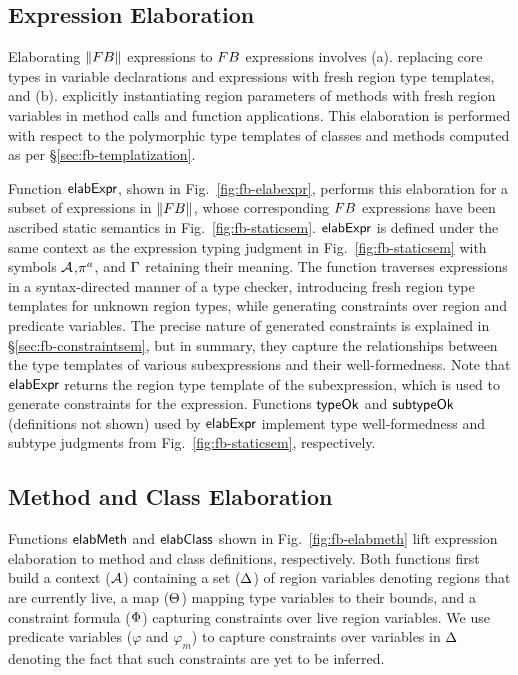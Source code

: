 


\subsection{Expression Elaboration}

Elaborating $\left\| {\sc FB} \right\|$ expressions to ${\sc FB}$ expressions involves
(a). replacing core types in variable declarations and 
expressions with fresh region type templates, and (b). explicitly
instantiating region parameters of methods with fresh region variables
in method calls and function applications. This elaboration is
performed with respect to the polymorphic type templates of classes
and methods computed as per \S\ref{sec:fb-templatization}. 

Function ${\sf elabExpr}$, shown in Fig.~\ref{fig:fb-elabexpr}, performs
this elaboration for a subset of expressions in $\left\| {\sc FB} \right\|$, whose
corresponding ${\sc FB}$ expressions have been ascribed static semantics in
Fig.~\ref{fig:fb-staticsem}. ${\sf elabExpr}$ is defined under the same
context as the expression typing judgment in
Fig.~\ref{fig:fb-staticsem} with symbols ${\mathcal{A}}$,$\pi^a$, and $\Gamma$
retaining their meaning. The function traverses expressions in a
syntax-directed manner of a type checker, introducing fresh region
type templates for unknown region types, while generating constraints
over region and predicate variables. The precise nature of generated
constraints is explained in \S\ref{sec:fb-constraintsem}, but in
summary, they capture the relationships between the type templates of
various subexpressions and their well-formedness. Note that
${\sf elabExpr}$ returns the region type template of the subexpression,
which is used to generate constraints for the expression. Functions
${\sf typeOk}$ and ${\sf subtypeOk}$ (definitions not shown) used by ${\sf elabExpr}$
implement type well-formedness and subtype judgments from
Fig.~\ref{fig:fb-staticsem}, respectively.

\subsection{Method and Class Elaboration}

Functions ${\sf elabMeth}$ and ${\sf elabClass}$ shown in
Fig.~\ref{fig:fb-elabmeth} lift expression elaboration to method and
class definitions, respectively. Both functions first build a context
(${\mathcal{A}}$) containing a set ($ \Delta$) of region variables denoting
regions that are currently live, a map ($\Theta$) mapping type
variables to their bounds, and a constraint formula ($\Phi$)
capturing constraints over live region variables. We use predicate
variables ($\varphi$ and $\varphi_m$) to capture constraints over
variables in $\Delta$ denoting the fact that such constraints are yet
to be inferred.

